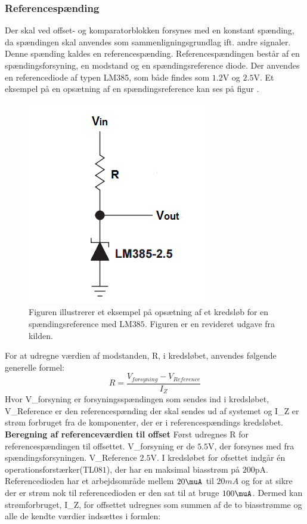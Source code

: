 \subsubsection{Referencespænding}
Der skal ved offset- og komparatorblokken forsynes med en konstant spænding, da spændingen skal anvendes som sammenligningsgrundlag ift. andre signaler. Denne spænding kaldes en referencespænding. Referencespændingen består af en spændingsforsyning, en modstand og en spændingsreference diode. Der anvendes en referencediode af typen LM385, som både findes som $1.2$V og $2.5$V. Et eksempel på en opsætning af en spændingsreference kan ses på figur .

\begin{figure}[H]
	\centering
	\includegraphics[scale=1.0]{figures/cProblemloesning/ReferenceEksempel}
	\caption{Figuren illustrerer et eksempel på opsætning af et kredsløb for en spændingsreference med LM$385$. Figuren er en revideret udgave fra kilden. \cite{Instruments2005}}
	\label{fig:Spaendingsreference}
\end{figure}

For at udregne værdien af modstanden, R, i kredsløbet, anvendes følgende generelle formel:
\begin{equation}
R=\dfrac{V_{forsyning}-V_{Reference}}{I_{Z}}
\end{equation}
Hvor V_{forsyning} er forsyningsspændingen som sendes ind i kredsløbet, V_{Reference} er den referencespænding der skal sendes ud af systemet og I_{Z} er strøm forbruget fra de komponenter, der er i referencespændings kredsløbet. 
\noindet \textbf{Beregning af referenceværdien til offset}
Først udregnes R for referencespændingen til offsettet. V_{forsyning} er de $5.5$V, der forsynes med fra spændingsforsyningen. V_{Reference} $2.5$V. I kredsløbet for ofsettet indgår én operationsforstærker(TL$081$), der har en maksimal biasstrøm på $200$pA\cite{Corporation1995}. Referencedioden har et arbejdsområde mellem $20\muA$ til $20mA$ og for at sikre der er strøm nok til referencedioden er den sat til at bruge $100\muA$\cite{Instruments2005}. Dermed kan strømforbruget, I_Z, for offsettet udregnes som summen af de to biasstrømme og alle de kendte værdier indsættes i formlen:

